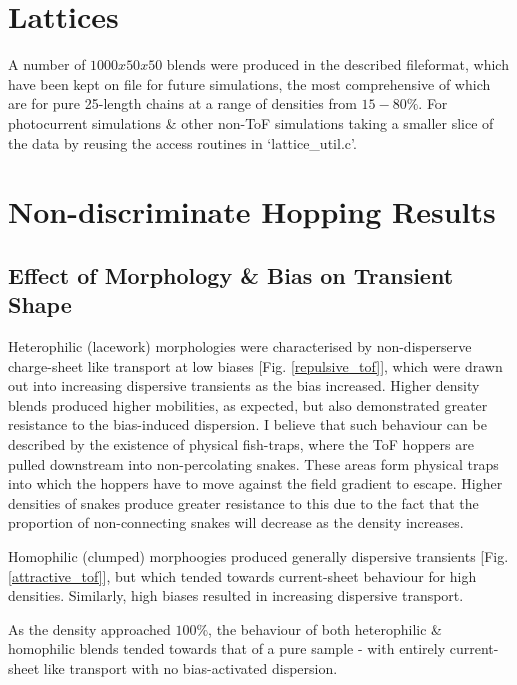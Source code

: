 \documentclass[twocolumn,a4,notitlepage]{report}
\begin{document}
\section{Lattices}

A number of $1000x50x50$ blends were produced in the described fileformat,
which have been kept on file for future simulations, the most comprehensive
of which are for pure 25-length chains at a range of densities from $15-80\%$. For photocurrent
simulations \& other non-ToF simulations taking a smaller slice of the data
by reusing the access routines in `lattice\_util.c'.

\section{Non-discriminate Hopping Results}

\subsection{Effect of Morphology \& Bias on Transient Shape}


Heterophilic (lacework) morphologies were characterised by non-disperserve
charge-sheet like transport at low biases [Fig. \ref{repulsive_tof}], which were drawn out into
increasing dispersive transients as the bias increased. Higher density
blends produced higher mobilities, as expected, but also demonstrated
greater resistance to the bias-induced dispersion. I believe that such
behaviour can be described by the existence of physical fish-traps, where
the ToF hoppers are pulled downstream into non-percolating snakes. These
areas form physical traps into which the hoppers have to move against the
field gradient to escape. Higher densities of snakes produce greater
resistance to this due to the fact that the proportion of non-connecting
snakes will decrease as the density increases.

Homophilic (clumped) morphoogies produced generally dispersive transients
[Fig. \ref{attractive_tof}],
but which tended towards current-sheet behaviour for high densities.
Similarly, high biases resulted in increasing dispersive transport.

As the density approached $100\%$, the behaviour of both heterophilic \&
homophilic blends tended towards that of a pure sample - with entirely
current-sheet like transport with no bias-activated dispersion.
\end{document}
